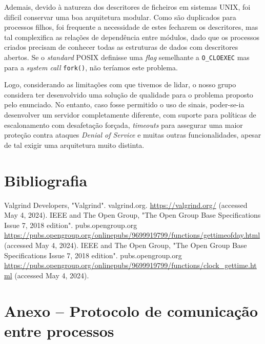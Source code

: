 \documentclass[11pt]{article}
\begin{document}
Ademais, devido à natureza dos descritores de ficheiros em sistemas UNIX, foi difícil conservar uma
boa arquitetura modular. Como são duplicados para processos filhos, foi frequente a necessidade de
estes fecharem os descritores, mas tal complexifica as relações de dependência entre módulos, dado
que os processos criados precisam de conhecer todas as estruturas de dados com descritores abertos.
Se o \emph{standard} POSIX definisse uma \emph{flag} semelhante a \texttt{O\_CLOEXEC} mas para a
\emph{system call} \texttt{fork()}, não teríamos este problema.

Logo, considerando as limitações com que tivemos de lidar, o nosso grupo considera ter desenvolvido
uma solução de qualidade para o problema proposto pelo enunciado. No entanto, caso fosse permitido o
uso de sinais, poder-se-ia desenvolver um servidor completamente diferente, com suporte para
políticas de escalonamento com desafetação forçada, \emph{timeouts} para assegurar uma maior
proteção contra ataques \emph{Denial of Service} e muitas outras funcionalidades, apesar de tal
exigir uma arquitetura muito distinta.

\section{Bibliografia}
\def\refname{}
\vspace{-1.5cm}
\begin{thebibliography}{9}
         Valgrind Developers, "Valgrind". valgrind.org.
         \url{https://valgrind.org/}
         (accessed May 4, 2024).
        IEEE and The Open Group, "The Open Group Base Specifications Issue 7, 2018 edition".
        pubs.opengroup.org
        \url{https://pubs.opengroup.org/onlinepubs/9699919799/functions/gettimeofday.html}
        (accessed May 4, 2024).
        IEEE and The Open Group, "The Open Group Base Specifications Issue 7, 2018 edition".
        pubs.opengroup.org
        \url{https://pubs.opengroup.org/onlinepubs/9699919799/functions/clock_gettime.html}
        (accessed May 4, 2024).
\end{thebibliography}

\section{Anexo -- Protocolo de comunicação entre processos}
\end{document}
